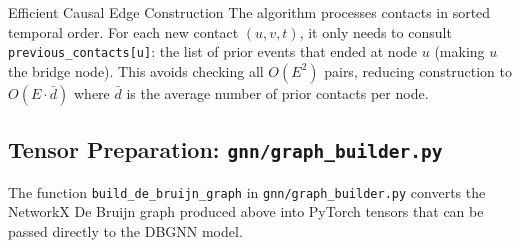 \begin{keyinsight}{Efficient Causal Edge Construction}
The algorithm processes contacts in sorted temporal order. For each new contact $(u, v, t)$, it
only needs to consult \texttt{previous\_contacts[u]}: the list of prior events that ended at
node $u$ (making $u$ the bridge node). This avoids checking all $O(E^2)$ pairs, reducing
construction to $O(E \cdot \bar{d})$ where $\bar{d}$ is the average number of prior contacts
per node.
\end{keyinsight}

\subsection{Tensor Preparation: \texttt{gnn/graph\_builder.py}}

The function \texttt{build\_de\_bruijn\_graph} in \texttt{gnn/graph\_builder.py} converts the
NetworkX De Bruijn graph produced above into PyTorch tensors that can be passed directly to the
DBGNN model.

